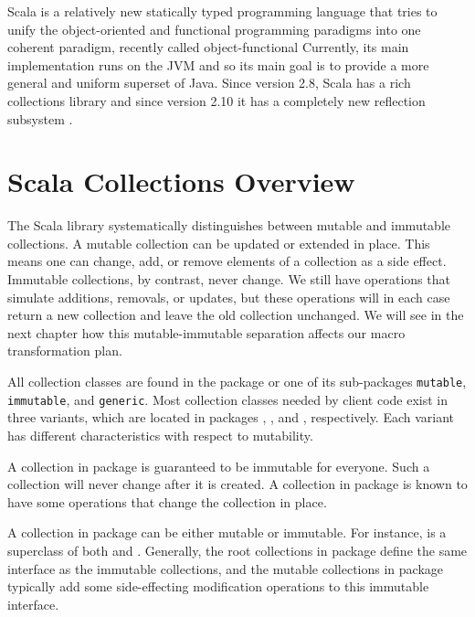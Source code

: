 \label{background}

Scala  is a relatively new statically typed programming language
that tries to unify the object-oriented and functional programming paradigms
into one coherent paradigm, recently called object-functional Currently, its
main implementation runs on the JVM and so its main goal is to provide a more
general and uniform superset of Java. Since version 2.8, Scala has a rich
collections library  and since version 2.10 it has a completely new reflection
subsystem .

\section{Scala Collections Overview}

The Scala library systematically distinguishes between mutable and immutable
collections. A mutable collection can be updated or extended in place. This
means one can change, add, or remove elements of a collection as a side effect.
Immutable collections, by contrast, never change. We still have operations
that simulate additions, removals, or updates, but these operations will in each
case return a new collection and leave the old collection unchanged. We will see
in the next chapter how this mutable-immutable separation affects our macro
transformation plan.

All collection classes are found in the package  or one of its
sub-packages \texttt{mutable}, \texttt{immutable}, and \texttt{generic}. Most collection
classes needed by client code exist in three variants, which are located in packages
, , and ,
respectively. Each variant has different characteristics with respect to
mutability.

A collection in package  is guaranteed to be immutable
for everyone. Such a collection will never change after it is created. A collection in package  is known to have some operations that change the collection in place.

A collection in package  can be either mutable or immutable. For
instance,  is a superclass of both
 and .
Generally, the root collections in package  define the same
interface as the immutable collections, and the mutable collections in package
 typically add some side-effecting modification
operations to this immutable interface.

